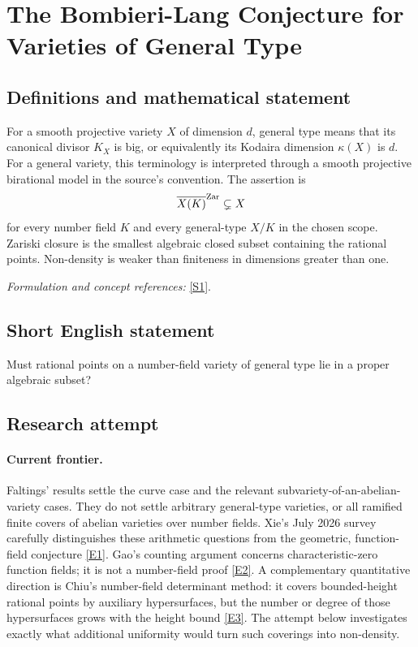 \documentclass[11pt,a4paper]{article}
\newcommand{\sref}[2]{\hyperlink{source:#1:#2}{[S#2]}}
\newcommand{\eref}[2]{\hyperlink{extra:#1:#2}{[E#2]}}
\newif\ifshowcatalogue
\newcommand{\cataloguescope}[1]{\ifshowcatalogue
 \paragraph{Exact scope in the supplied catalogue.}
 \begin{quote}\small #1\end{quote}\fi}
\numberwithin{equation}{section}
\begin{document}
\setcounter{section}{54}
\clearpage
\section{\texorpdfstring{The Bombieri-Lang Conjecture for Varieties of General Type}{The Bombieri-Lang Conjecture for Varieties of General Type}}\label{55}
\subsection{Definitions and mathematical statement}
For a smooth projective variety $X$ of dimension $d$, general type means that its canonical divisor $K_X$ is big, or equivalently its Kodaira dimension $\kappa(X)$ is $d$. For a general variety, this terminology is interpreted through a smooth projective birational model in the source's convention. The assertion is
\[
 \overline{X(K)}^{\rm Zar}\subsetneq X
\]
for every number field $K$ and every general-type $X/K$ in the chosen scope. Zariski closure is the smallest algebraic closed subset containing the rational points. Non-density is weaker than finiteness in dimensions greater than one.
\par\smallskip\textit{Formulation and concept references:} \sref{55}{1}.
\cataloguescope{Prove that for every variety X of general type defined over a number field K, the set of K-rational points X(K) is not Zariski dense in X.}
\subsection{Short English statement}
Must rational points on a number-field variety of general type lie in a proper algebraic subset?
\subsection{Research attempt}

\paragraph{Current frontier.}
Faltings' results settle the curve case and the relevant subvariety-of-an-abelian-variety cases. They do not settle arbitrary general-type varieties, or all ramified finite covers of abelian varieties over number fields. Xie's July 2026 survey carefully distinguishes these arithmetic questions from the geometric, function-field conjecture \eref{55}{1}. Gao's counting argument concerns characteristic-zero function fields; it is not a number-field proof \eref{55}{2}. A complementary quantitative direction is Chiu's number-field determinant method: it covers bounded-height rational points by auxiliary hypersurfaces, but the number or degree of those hypersurfaces grows with the height bound \eref{55}{3}. The attempt below investigates exactly what additional uniformity would turn such coverings into non-density.
\end{document}
